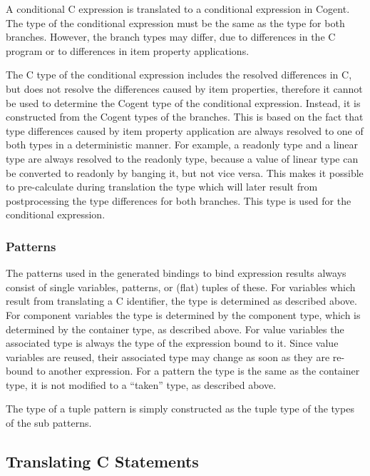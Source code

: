 A conditional C expression is translated to a conditional expression in Cogent. The type of the conditional expression
must be the same as the type for both branches. However, the branch types may differ, due to differences in the C program
or to differences in item property applications.

The C type of the conditional expression includes the resolved differences in C, but does not resolve the differences
caused by item properties, therefore it cannot be used to determine the Cogent type of the conditional expression. Instead,
it is constructed from the Cogent types of the branches. This is based on the fact that type differences caused by item
property application are always resolved to one of both types in a deterministic manner. For example, a readonly type and
a linear type are always resolved to the readonly type, because a value of linear type can be converted to readonly by
banging it, but not vice versa. This makes it possible to pre-calculate during translation the type which will later result
from postprocessing the type differences for both branches. This type is used for the conditional expression.

\subsubsection{Patterns}

The patterns used in the generated bindings to bind expression results always consist of single variables, 
patterns, or (flat) tuples of these. For variables which result from translating a C identifier, the type is determined
as described above. For component variables the type is determined by the component type, which is determined by the
container type, as described above. For value variables the associated type is always the type of the expression bound
to it. Since value variables are reused, their associated type may change as soon as they are re-bound to another expression.
For a  pattern the type is the same as the container type, it is not modified to a ``taken'' type, as described
above.

The type of a tuple pattern is simply constructed as the tuple type of the types of the sub patterns.

\subsection{Translating C Statements}
\label{impl-ccode-cstats}


